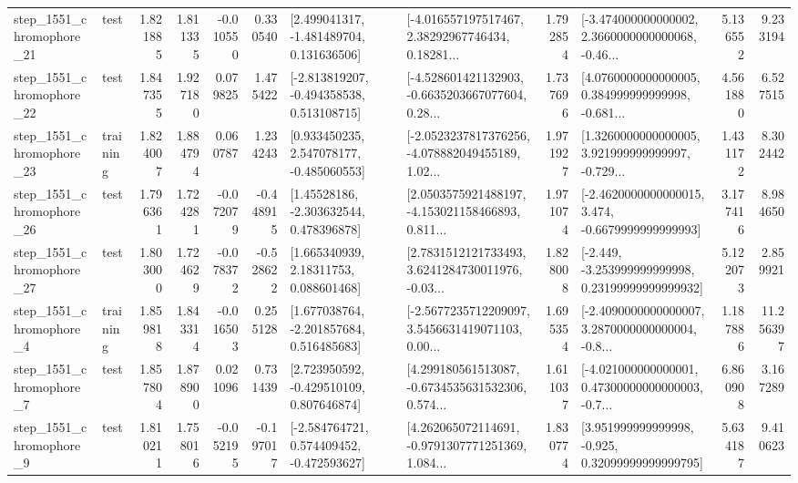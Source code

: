 \begin{tabular}{llrrrrllrlrr}
 step\_1551\_chromophore\_21 &      test &      1.821885 &    1.811335 &     -0.010550 &  0.330540 &    [2.499041317, -1.481489704, 0.131636506] &  [-4.016557197517467, 2.38292967746434, 0.18281... &       1.792854 &  [-3.474000000000002, 2.3660000000000068, -0.46... &            5.136552 &          9.233194 \\
 step\_1551\_chromophore\_22 &      test &      1.847355 &    1.927180 &      0.079825 &  1.475422 &   [-2.813819207, -0.494358538, 0.513108715] &  [-4.528601421132903, -0.6635203667077604, 0.28... &       1.737696 &  [4.0760000000000005, 0.384999999999998, -0.681... &            4.561880 &          6.527515 \\
 step\_1551\_chromophore\_23 &  training &      1.824007 &    1.884794 &      0.060787 &  1.234243 &    [0.933450235, 2.547078177, -0.485060553] &  [-2.0523237817376256, -4.078882049455189, 1.02... &       1.971927 &  [1.3260000000000005, 3.921999999999997, -0.729... &            1.431172 &          8.302442 \\
 step\_1551\_chromophore\_26 &      test &      1.796361 &    1.724281 &     -0.072079 & -0.448915 &     [1.45528186, -2.303632544, 0.478396878] &  [2.0503575921488197, -4.153021158466893, 0.811... &       1.971074 &  [-2.4620000000000015, 3.474, -0.6679999999999993] &            3.177416 &          8.984650 \\
 step\_1551\_chromophore\_27 &      test &      1.803000 &    1.724629 &     -0.078372 & -0.528622 &      [1.665340939, 2.18311753, 0.088601468] &  [2.7831512121733493, 3.6241284730011976, -0.03... &       1.828008 &  [-2.449, -3.253999999999998, 0.23199999999999932] &            5.122073 &          2.859921 \\
  step\_1551\_chromophore\_4 &  training &      1.859818 &    1.843314 &     -0.016503 &  0.255128 &    [1.677038764, -2.201857684, 0.516485683] &  [-2.5677235712209097, 3.5456631419071103, 0.00... &       1.695354 &  [-2.4090000000000007, 3.2870000000000004, -0.8... &            1.187886 &         11.256397 \\
  step\_1551\_chromophore\_7 &      test &      1.857804 &    1.878900 &      0.021096 &  0.731439 &    [2.723950592, -0.429510109, 0.807646874] &  [4.299180561513087, -0.6734535631532306, 0.574... &       1.611037 &  [-4.021000000000001, 0.47300000000000003, -0.7... &            6.860908 &          3.167289 \\
  step\_1551\_chromophore\_9 &      test &      1.810211 &    1.758016 &     -0.052195 & -0.197017 &   [-2.584764721, 0.574409452, -0.472593627] &  [4.262065072114691, -0.9791307771251369, 1.084... &       1.830774 &   [3.951999999999998, -0.925, 0.32099999999999795] &            5.634187 &          9.410623 \\

\end{tabular}
